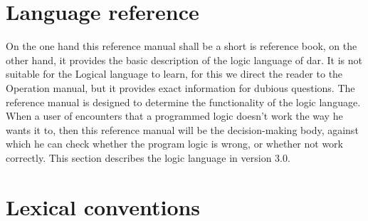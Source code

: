
\newcommand{\bi}{\begin{itemize}}
\newcommand{\ei}{\end{itemize}}


\pagestyle{headings}

\chapter{Language reference}\label{cha:sprachreferenz}
\label{eins}

On the one hand this reference manual shall be a short
is reference book, on the other hand, it provides the basic
description of 
the logic language of \mutabor{} dar. It is not suitable for the
Logical language to learn, for this we direct the reader to the
Operation manual, but it provides exact information for dubious
questions.
The reference manual is designed to
determine the functionality of the logic language. When a user
 of \mutabor{} encounters that a programmed logic 
doesn't work the way he wants it to, then this
reference manual will be the decision-making body, against which he
can check whether the program logic is wrong, or whether
\mutabor{} not work correctly.
This section describes the logic language \mutabor{} in version 3.0.
\iffalse
Das Referenzhandbuch soll einerseits ein kurzes
Nachschlagewerk sein, andererseits stellt es die Basisbeschreibung
der Logiksprache \mutabor{} dar. Es ist nicht dafür geeignet, die
Logiksprache zu erlernen, dafür sei an dieser Stelle auf das
Bedienungshandbuch verwiesen, sondern gibt bei zweifelhaften
Fragen exakte Auskünfte. Das Referenzhandbuch ist dafür gedacht,
die Funktionalität der Logiksprache festzulegen. Wenn ein Benutzer
von \mutabor{} feststellt, daß eine von ihm programmierte Logik
nicht so funktioniert, wie er es wünscht, so ist dieses
Referenzhandbuch die Entscheidungsinstanz, anhand derer man
feststellen kann, ob das Logikprogramm falsch ist, oder ob
\mutabor{} nicht korrekt funktioniert.
Dieser Abschnitt beschreibt die Logiksprache \mutabor{} in der Version
3.0.
\fi

\chapter{Lexical conventions}\label{cha:lexik-konv}
\label{zwei}

